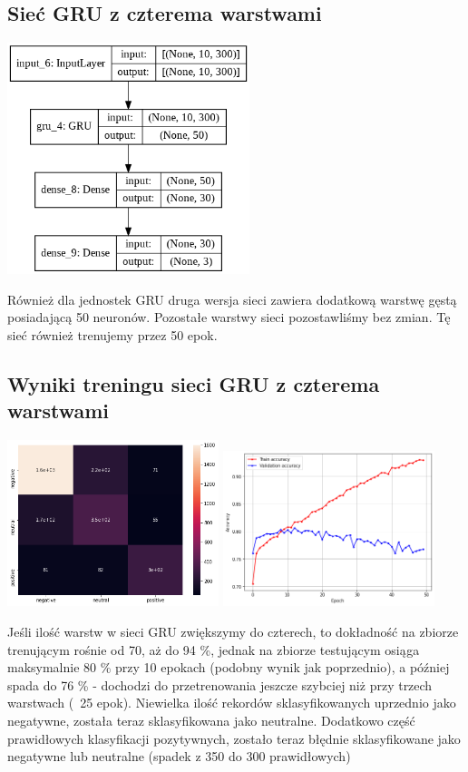 \documentclass[11pt, a4paper, notitlepage]{report}
\begin{document}
\subsection{Sieć GRU z czterema warstwami}
\begin{center}
\includegraphics[width=200pt]{graphics/model_GRU_4_warstwy_10.png}
\end{center}
Również dla jednostek GRU druga wersja sieci zawiera dodatkową warstwę gęstą posiadającą 50 neuronów. Pozostałe warstwy sieci pozostawliśmy bez zmian. Tę sieć również trenujemy przez 50 epok.

\subsection{Wyniki treningu sieci GRU z czterema warstwami}
\begin{center}
\includegraphics[width=175pt]{graphics/heatmap_GRU_4_10_slow.png}
\includegraphics[width=175pt]{graphics/accuracy_GRU_4_10_slow.png}
\end{center}
Jeśli ilość warstw w sieci GRU zwiększymy do czterech, to dokładność na zbiorze trenującym rośnie od 70, aż do 94 \%, jednak na zbiorze testującym osiąga maksymalnie 80 \% przy 10 epokach (podobny wynik jak poprzednio), a później spada do 76 \% - dochodzi do przetrenowania jeszcze szybciej niż przy trzech warstwach (~25 epok). Niewielka ilość rekordów sklasyfikowanych uprzednio jako negatywne, została teraz sklasyfikowana jako neutralne. Dodatkowo część prawidłowych klasyfikacji pozytywnych, zostało teraz błędnie sklasyfikowane jako negatywne lub neutralne (spadek z 350 do 300 prawidłowych)
\end{document}
